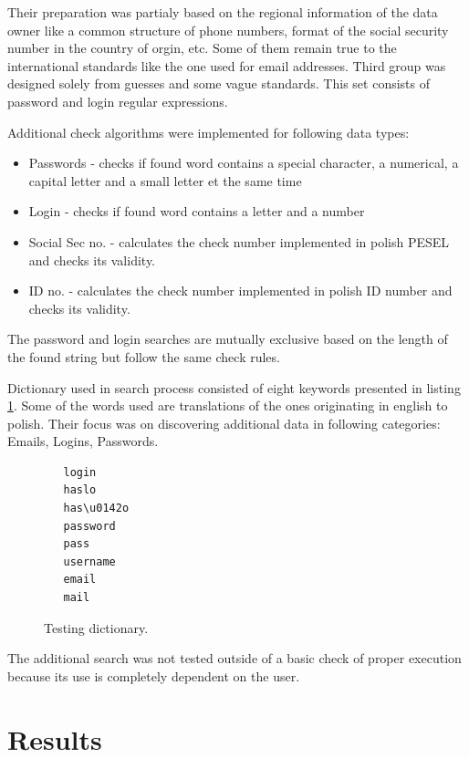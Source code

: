\documentclass[a4paper,twoside,12pt]{book}
\begin{document}
Their preparation was partialy based on the regional information of the data owner like a common structure of phone numbers, format of the social security number in the
country of orgin, etc. Some of them remain true to the international standards like the one used for email addresses. Third group was designed solely from guesses and
some vague standards. This set consists of password and login regular expressions.

Additional check algorithms were implemented for following data types:

\begin{itemize}
   \item Passwords - checks if found word contains a special character, a numerical, a capital letter and a small letter et the same time
   \item Login - checks if found word contains a letter and a number
   \item Social Sec no. - calculates the check number implemented in polish PESEL and checks its validity.
   \item ID no. - calculates the check number implemented in polish ID number and checks its validity.
\end{itemize}

The password and login searches are mutually exclusive based on the length of the found string but follow the same
check rules.

Dictionary used in search process consisted of eight keywords presented in listing \ref{fig:dictionary}. 
Some of the words used are translations of the ones originating in english to polish. Their focus was on discovering
additional data in following categories: Emails, Logins, Passwords.

\begin{figure}
   \centering
   \begin{lstlisting}
   login
   haslo
   has\u0142o
   password
   pass
   username
   email
   mail
   \end{lstlisting}
   \caption{Testing dictionary.}
   \label{fig:dictionary}
\end{figure}

The additional search was not tested outside of a basic check of proper execution because its use is completely dependent on the user.

\section{Results}
\end{document}
